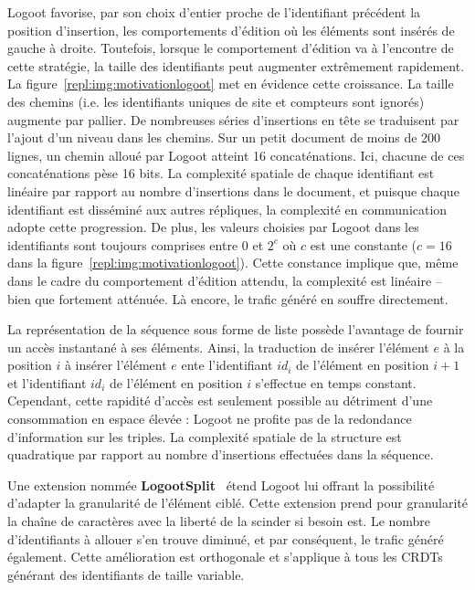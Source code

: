 \noindent Logoot favorise, par son choix d'entier proche de l'identifiant
précédent la position d'insertion, les comportements d'édition où les éléments
sont insérés de gauche à droite. Toutefois, lorsque le comportement d'édition va
à l'encontre de cette stratégie, la taille des identifiants peut augmenter
extrêmement rapidement. La figure~\ref{repl:img:motivationlogoot} met en
évidence cette croissance. La taille des chemins (i.e. les identifiants uniques
de site et compteurs sont ignorés) augmente par pallier. De nombreuses séries
d'insertions en tête se traduisent par l'ajout d'un niveau dans les chemins. Sur
un petit document de moins de 200 lignes, un chemin alloué par Logoot atteint 16
concaténations. Ici, chacune de ces concaténations pèse 16 bits.  La complexité
spatiale de chaque identifiant est linéaire par rapport au nombre d'insertions dans
le document, et puisque chaque identifiant est disséminé aux autres répliques,
la complexité en communication adopte cette progression. De plus, les valeurs
choisies par Logoot dans les identifiants sont toujours comprises entre $0$ et
$2^{c}$ où $c$ est une constante ($c = 16$ dans la
figure~\ref{repl:img:motivationlogoot}). Cette constance implique que, même dans
le cadre du comportement d'édition attendu, la complexité est linéaire -- bien
que fortement atténuée. Là encore, le trafic généré en souffre directement.

\noindent La représentation de la séquence sous forme de liste possède
l'avantage de fournir un accès instantané à ses éléments. Ainsi, la traduction
de \og insérer l'élément $e$ à la position $i$ \fg à \og insérer l'élément $e$
ente l'identifiant $id_{i}$ de l'élément en position $i+1$ et l'identifiant
$id_i$ de l'élément en position $i$ \fg s'effectue en temps constant.
Cependant, cette rapidité d'accès est seulement possible au détriment d'une
consommation en espace élevée : Logoot ne profite pas de la redondance
d'information sur les triples. La complexité spatiale de la structure est
quadratique par rapport au nombre d'insertions effectuées dans la séquence.

\noindent Une extension nommée \textbf{LogootSplit}~\cite{andre2013supporting}
étend Logoot lui offrant la possibilité d'adapter la granularité de l'élément
ciblé.  Cette extension prend pour granularité la chaîne de caractères avec la
liberté de la scinder si besoin est. Le nombre d'identifiants à allouer s'en
trouve diminué, et par conséquent, le trafic généré également. Cette
amélioration est orthogonale et s'applique à tous les CRDTs générant des
identifiants de taille variable.

